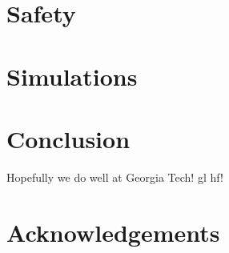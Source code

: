 \documentclass{article}
\begin{document}
\section{Safety}

\section{Simulations}

\section{Conclusion}

Hopefully we do well at Georgia Tech! gl hf! 

\section{Acknowledgements}



\end{document}
